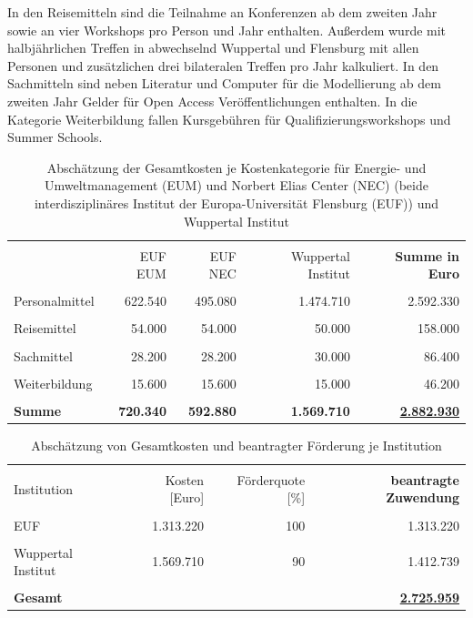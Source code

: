 \documentclass[a4paper,11pt,twoside]{scrartcl}
\begin{document}
In den Reisemitteln sind die Teilnahme an Konferenzen ab dem zweiten Jahr sowie an vier Workshops pro Person und Jahr enthalten. Außerdem wurde mit halbjährlichen Treffen in abwechselnd Wuppertal und Flensburg mit allen Personen und zusätzlichen drei bilateralen Treffen pro Jahr kalkuliert. In den Sachmitteln sind neben Literatur und Computer für die Modellierung ab dem zweiten Jahr Gelder für Open Access Veröffentlichungen enthalten. In die Kategorie Weiterbildung fallen Kursgebühren für Qualifizierungsworkshops und Summer Schools.

\begin{table}[h]
\begin{center}
  \caption{Abschätzung der Gesamtkosten je Kostenkategorie für Energie- und Umweltmanagement (EUM) und Norbert Elias Center (NEC) (beide interdisziplinäres Institut der Europa-Universität Flensburg (EUF)) und Wuppertal Institut}
\small  
\begin{tabular}[h]{|l | r | r | r | r|}
\hline
&&&&\\
& EUF EUM & EUF NEC & Wuppertal Institut & \textbf{Summe in Euro}\\
\hline
\hline
&&&&\\
 Personalmittel & 622.540 & 495.080 & 1.474.710 & 2.592.330\\
 \hline
 &&&&\\
 Reisemittel & 54.000 & 54.000 & 50.000 & 158.000\\
 \hline
 &&&&\\
 Sachmittel & 28.200 & 28.200 & 30.000 & 86.400\\
 \hline
 &&&&\\
 Weiterbildung & 15.600 & 15.600 & 15.000 & 46.200\\
 \hline
 \hline
 &&&&\\
 \textbf{Summe}& \textbf{720.340} & \textbf{592.880} & \textbf{1.569.710} & \underline{\textbf{2.882.930}}\\
 \hline
 \end{tabular}
 \label{tab:kostenkalkulation}
\end{center}
\end{table}

\begin{table}[h]
\small
\begin{center}
  \caption{Abschätzung von Gesamtkosten und beantragter Förderung je Institution}
\begin{tabular}[h]{|l | r | r | r|}
\hline
&&&\\
Institution & Kosten [Euro] & Förderquote [\%] & \textbf{beantragte Zuwendung}\\
\hline
\hline
 &&&\\
 EUF & 1.313.220 & 100 & 1.313.220\\
 \hline
 &&&\\
 Wuppertal Institut & 1.569.710 & 90 & 1.412.739
\\
 \hline
 \hline
 &&&\\
 \textbf{Gesamt} & & &\underline{\textbf{2.725.959}}\\
 \hline
 \end{tabular}
 \label{tab:kostenkalkulation2}
\end{center}
\end{table}
\end{document}
